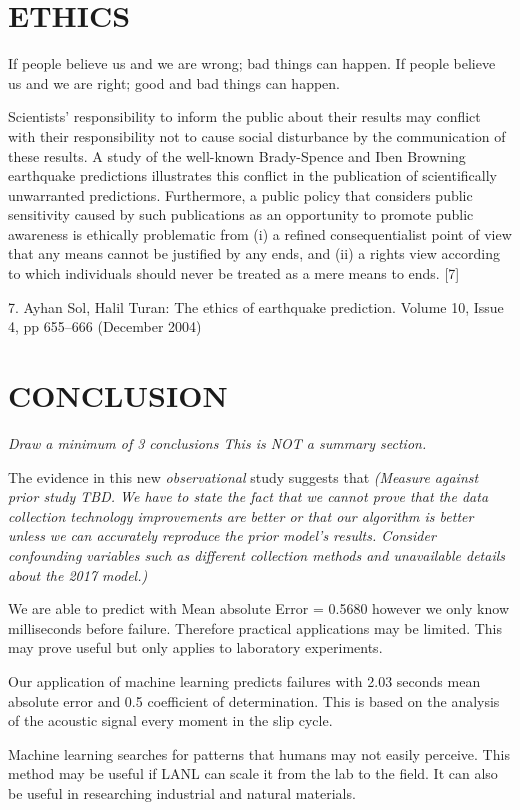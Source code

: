 \documentclass[]{llncs}
\begin{document}
\section{ETHICS}
If people believe us and we are wrong; bad things can happen. If people believe us and we are right; good and bad things can happen.

Scientists’ responsibility to inform the public about their results may conflict with their responsibility not to cause social disturbance by the communication of these results. A study of the well-known Brady-Spence and Iben Browning earthquake predictions illustrates this conflict in the publication of scientifically unwarranted predictions. Furthermore, a public policy that considers public sensitivity caused by such publications as an opportunity to promote public awareness is ethically problematic from (i) a refined consequentialist point of view that any means cannot be justified by any ends, and (ii) a rights view according to which individuals should never be treated as a mere means to ends. [7]

7.	Ayhan Sol, Halil Turan: The ethics of earthquake prediction.  Volume 10, Issue 4, pp 655–666 (December 2004)
\section{CONCLUSION}
{\em Draw a minimum of 3 conclusions  This is NOT a summary section.} 
\par



The evidence in this new {\em observational} study suggests that {\em (Measure against prior study TBD. We have to state the fact that we cannot prove that the data collection technology improvements are better or that our algorithm is better unless we can accurately reproduce the prior model's results. Consider confounding variables such as different collection methods and unavailable details about the 2017 model.)}\par

We are able to predict with Mean absolute Error = 0.5680 however we  only know milliseconds before failure.
 Therefore practical applications may be limited. This may prove useful but only applies to laboratory experiments. 
 
 Our application of machine learning predicts failures with 2.03 seconds mean absolute error and 0.5 coefficient of determination. This is based on the analysis of the acoustic signal every moment in the slip cycle. 
 
 Machine learning searches for patterns that humans may not easily perceive. This method may be useful if LANL can scale it from the lab to the field. It can also be useful in researching industrial and natural materials.
 
 
 
 
\par



\end{document}
